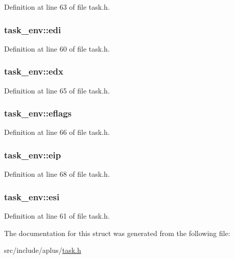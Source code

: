 Definition at line 63 of file task.\+h.

\hypertarget{structtask__env_afd28f73e49aab123e4c2a5f149f10fe2}{
\subsubsection[{edi}]{ task\+\_\+env\+::edi}}\label{structtask__env_afd28f73e49aab123e4c2a5f149f10fe2}


Definition at line 60 of file task.\+h.

\hypertarget{structtask__env_ab76a643115c795f2f9feb5582ea29497}{
\subsubsection[{edx}]{ task\+\_\+env\+::edx}}\label{structtask__env_ab76a643115c795f2f9feb5582ea29497}


Definition at line 65 of file task.\+h.

\hypertarget{structtask__env_a1eeaac73d44a6550af32a9dd726935e5}{
\subsubsection[{eflags}]{ task\+\_\+env\+::eflags}}\label{structtask__env_a1eeaac73d44a6550af32a9dd726935e5}


Definition at line 66 of file task.\+h.

\hypertarget{structtask__env_ae6f3defc8a0fe9512785fdfd2eedd07d}{
\subsubsection[{eip}]{ task\+\_\+env\+::eip}}\label{structtask__env_ae6f3defc8a0fe9512785fdfd2eedd07d}


Definition at line 68 of file task.\+h.

\hypertarget{structtask__env_a4bae98183ee224f67097a00d887a229b}{
\subsubsection[{esi}]{ task\+\_\+env\+::esi}}\label{structtask__env_a4bae98183ee224f67097a00d887a229b}


Definition at line 61 of file task.\+h.



The documentation for this struct was generated from the following file\+:\begin{DoxyCompactItemize}
\item 
src/include/aplus/\hyperlink{task_8h}{task.\+h}\end{DoxyCompactItemize}
